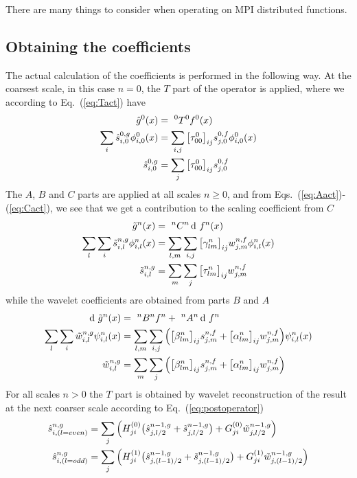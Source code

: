 There are many things to consider when operating on MPI distributed functions.

\subsection{Obtaining the coefficients}
The actual calculation of the coefficients is performed in the following way.
At the coarsest scale, in this case $n=0$, the $T$ part of the operator is applied,
where we according to Eq.~(\ref{eq:Tact}) have
\begin{align}
    {\hat{g}}^{0}(x) &=\ ^{0}T^{0}{f}^{0}(x) \\
    \sum_i \hat{s}^{0,g}_{i,0}\phi_{i,0}^0(x)
	&= \sum_{i,j} \big[\tau^0_{00}\big]_{ij}
	s^{0,f}_{j,0}\phi_{i,0}^0(x) \\
    \hat{s}^{0,g}_{i,0} 
	&= \sum_j \big[\tau^0_{00}\big]_{ij} s^{0,f}_{j,0}
\end{align}
The $A$, $B$ and $C$ parts are applied at all scales $n\geq0$, and from 
Eqs.~(\ref{eq:Aact})-(\ref{eq:Cact}), we see that we get a contribution to the 
scaling coefficient from $C$
\begin{align}
    \scalingrep{\tilde{g}}{n}(x) &=\ \C{n}{n}\waveletrep{f}{n}(x) \\
    \sum_l\sum_i \tilde{\scalingcoef}^{n,g}_{i,l}\scaling_{i,l}^n(x)
	&= \sum_{l,m}\sum_{i,j} \big[\gamma^n_{lm}\big]_{ij}
	\waveletcoef^{n,f}_{j,m} \scaling_{i,l}^n(x) \\
    \tilde{\scalingcoef}^{n,g}_{i,l} 
	&= \sum_m\sum_j \big[\tau^n_{lm}\big]_{ij} \waveletcoef^{n,f}_{j,m}
\end{align}
while the wavelet coefficients are obtained from parts $B$ and $A$
\begin{align}
    \waveletrep{\tilde{g}}{n}(x) &=\ 
	\B{n}{n}\scalingrep{f}{n} +\ \A{n}{n}\waveletrep{f}{n}\\
    \sum_l\sum_i \tilde{\waveletcoef}^{n,g}_{i,l}\wavelet_{i,l}^n(x)
	&= \sum_{l,m}\sum_{i,j} \Big(
	\big[\beta^n_{lm}\big]_{ij} \scalingcoef^{n,f}_{j,m} +
	\big[\alpha^n_{lm}\big]_{ij}\waveletcoef^{n,f}_{j,m}
	\Big) \wavelet_{i,l}^n(x) \\
    \tilde{\waveletcoef}^{n,g}_{i,l}
	&= \sum_{m}\sum_{j} \Big(
	\big[\beta^n_{lm}\big]_{ij} \scalingcoef^{n,f}_{j,m} +
	\big[\alpha^n_{lm}\big]_{ij}\waveletcoef^{n,f}_{j,m} \Big)
\end{align}
For all scales $n>0$ the $T$ part is obtained by wavelet reconstruction of the
result at the next coarser scale according to Eq.~(\ref{eq:postoperator}) 
\begin{align}
    \hat{s}^{n,g}_{i,(l=even)} &=
	\sum_j \Big(H_{ji}^{(0)}\big(
	\hat{s}_{j,l/2}^{n-1,g} + 
	\tilde{s}_{j,l/2}^{n-1,g} \big) + 
	G_{ji}^{(0)} \tilde{w}_{j,l/2}^{n-1,g} \Big)\\
    \hat{s}^{n,g}_{i,(l=odd)} &=
	\sum_j \Big(H_{ji}^{(1)}\big(
	\hat{s}_{j,(l-1)/2}^{n-1,g} +  
	\tilde{s}_{j,(l-1)/2}^{n-1,g} \big) + 
	G_{ji}^{(1)} \tilde{w}_{j,(l-1)/2}^{n-1,g} \Big)
\end{align}

